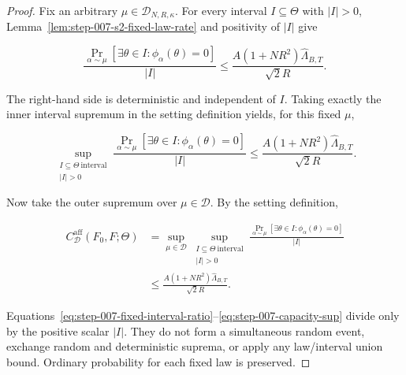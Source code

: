 \begin{proof}
Fix an arbitrary \(\mu\in\mathcal D_{N,R,\kappa}\). For every interval
\(I\subseteq\Theta\) with \(\lvert I\rvert>0\),
Lemma~\ref{lem:step-007-s2-fixed-law-rate} and positivity of \(\lvert I\rvert\) give

\begin{equation}
\frac{
\Pr_{\alpha\sim\mu}[\exists\theta\in I:\phi_\alpha(\theta)=0]
}{\lvert I\rvert}
\leq
\frac{A(1+NR^2)\widehat\Lambda_{B,T}}{\sqrt2R}.
\label{eq:step-007-fixed-interval-ratio}
\end{equation}

The right-hand side is deterministic and independent of \(I\). Taking exactly the inner interval supremum in
the setting definition yields, for this fixed \(\mu\),

\begin{equation}
\sup_{\substack{I\subseteq\Theta\ \mathrm{interval}\\ \lvert I\rvert>0}}
\frac{
\Pr_{\alpha\sim\mu}[\exists\theta\in I:\phi_\alpha(\theta)=0]
}{\lvert I\rvert}
\leq
\frac{A(1+NR^2)\widehat\Lambda_{B,T}}{\sqrt2R}.
\label{eq:step-007-fixed-law-sup}
\end{equation}

Now take the outer supremum over \(\mu\in\mathcal D\). By the setting definition,

\begin{equation}
\begin{aligned}
C^{\mathrm{aff}}_{\mathcal D}(F_0,F;\Theta)
&=
\sup_{\mu\in\mathcal D}
\sup_{\substack{I\subseteq\Theta\ \mathrm{interval}\\ \lvert I\rvert>0}}
\frac{
\Pr_{\alpha\sim\mu}[\exists\theta\in I:\phi_\alpha(\theta)=0]
}{\lvert I\rvert}\\
&\leq
\frac{A(1+NR^2)\widehat\Lambda_{B,T}}{\sqrt2R}.
\end{aligned}
\label{eq:step-007-capacity-sup}
\end{equation}

Equations~\eqref{eq:step-007-fixed-interval-ratio}--\eqref{eq:step-007-capacity-sup}
divide only by the positive scalar \(\lvert I\rvert\). They do not form a simultaneous
random event, exchange random and deterministic suprema, or apply any law/interval union bound. Ordinary
probability for each fixed law is preserved. 
\end{proof}

